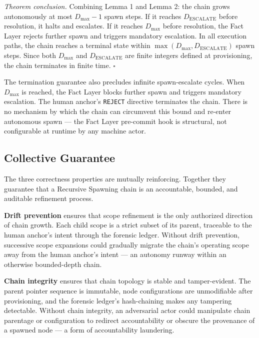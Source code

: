 \medskip
\textit{Theorem conclusion.} Combining Lemma 1 and Lemma 2: the chain grows autonomously at most $D_{\mathrm{max}} - 1$ spawn steps. If it reaches $D_{\mathrm{ESCALATE}}$ before resolution, it halts and escalates. If it reaches $D_{\mathrm{max}}$ before resolution, the Fact Layer rejects further spawn and triggers mandatory escalation. In all execution paths, the chain reaches a terminal state within $\max(D_{\mathrm{max}}, D_{\mathrm{ESCALATE}})$ spawn steps. Since both $D_{\mathrm{max}}$ and $D_{\mathrm{ESCALATE}}$ are finite integers defined at provisioning, the chain terminates in finite time. $\square$

The termination guarantee also precludes infinite spawn-escalate cycles. When $D_{\mathrm{max}}$ is reached, the Fact Layer blocks further spawn and triggers mandatory escalation. The human anchor's \texttt{REJECT} directive terminates the chain. There is no mechanism by which the chain can circumvent this bound and re-enter autonomous spawn — the Fact Layer pre-commit hook is structural, not configurable at runtime by any machine actor.

\subsection{Collective Guarantee}
\label{sec:rs-collective-guarantee}

The three correctness properties are mutually reinforcing. Together they guarantee that a Recursive Spawning chain is an accountable, bounded, and auditable refinement process.

\medskip
\textbf{Drift prevention} ensures that scope refinement is the only authorized direction of chain growth. Each child scope is a strict subset of its parent, traceable to the human anchor's intent through the forensic ledger. Without drift prevention, successive scope expansions could gradually migrate the chain's operating scope away from the human anchor's intent — an autonomy runway within an otherwise bounded-depth chain.

\medskip
\textbf{Chain integrity} ensures that chain topology is stable and tamper-evident. The parent pointer sequence is immutable, node configurations are unmodifiable after provisioning, and the forensic ledger's hash-chaining makes any tampering detectable. Without chain integrity, an adversarial actor could manipulate chain parentage or configuration to redirect accountability or obscure the provenance of a spawned node — a form of accountability laundering.

